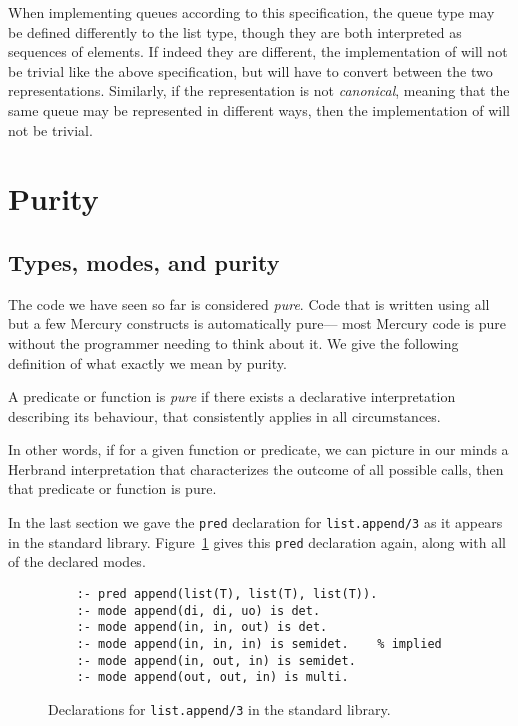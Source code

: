 When implementing queues according to this specification,
the queue type may be defined differently to the list type,
though they are both interpreted as sequences of elements.
If indeed they are different,
the implementation of 
will not be trivial like the above specification,
but will have to convert between the two representations.
Similarly,
if the representation is not \emph{canonical},
meaning that the same queue may be represented in different ways,
then the implementation of 
will not be trivial.


\section{Purity}
\label{sec:purity}

\subsection{Types, modes, and purity}
\label{sec:types-modes-purity}

The code we have seen so far is considered \emph{pure}.
Code that is written using
all but a few Mercury constructs
is automatically pure---%
most Mercury code is pure
without the programmer needing to think about it.
We give the following definition
of what exactly we mean by purity.

\begin{definition}[Purity] \label{gi:pure}
A predicate or function is \emph{pure}
if there exists a declarative interpretation describing its behaviour,
that consistently applies in all circumstances.
\end{definition}

\noindent
In other words,
if for a given function or predicate,
we can picture in our minds a Herbrand interpretation
that characterizes the outcome of all possible calls,
then that predicate or function is pure.

In the last section we gave
the \texttt{pred} declaration for \texttt{list.append/3}
as it appears in the standard library.
Figure~\ref{fig:append-decls} gives this \texttt{pred} declaration again,
along with all of the declared modes.

\begin{figure}
\begin{verbatim}
    :- pred append(list(T), list(T), list(T)).
    :- mode append(di, di, uo) is det.
    :- mode append(in, in, out) is det.
    :- mode append(in, in, in) is semidet.    % implied
    :- mode append(in, out, in) is semidet.
    :- mode append(out, out, in) is multi.
\end{verbatim}
\caption{Declarations for \texttt{list.append/3} in the standard library.
\label{fig:append-decls}}
\end{figure}

